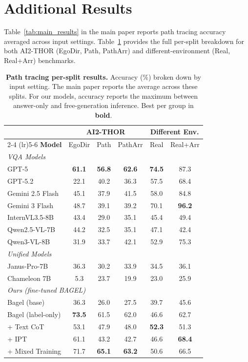 \documentclass{llmxive}
\begin{document}
\section{Additional Results}
\label{supp_additional_results}

Table~\ref{tab:main_results} in the main paper reports path tracing accuracy averaged across input settings.
Table~\ref{tab:pt_breakdown} provides the full per-split breakdown for both AI2-THOR (EgoDir, Path, PathArr) and different-environment (Real, Real+Arr) benchmarks.

\begin{table}[]
  \centering
  \small
  \begin{tabular}{l ccc cc}
    \toprule
    & \multicolumn{3}{c}{\textbf{AI2-THOR}} & \multicolumn{2}{c}{\textbf{Different Env.}} \\
    \cmidrule(lr){2-4} \cmidrule(lr){5-6}
    \textbf{Model}
      & EgoDir & Path & PathArr
      & Real & Real+Arr \\
    \midrule
    \multicolumn{6}{l}{\emph{VQA Models}} \\
    GPT-5            & \textbf{61.1} & \textbf{56.8} & \textbf{62.6} & \textbf{74.5} & 87.3 \\
    GPT-5.2          & 22.1 & 40.2 & 36.3 & 57.5 & 68.4 \\
    Gemini 2.5 Flash & 45.1 & 37.9 & 41.5 & 58.0 & 84.8 \\
    Gemini 3 Flash   & 48.7 & 39.1 & 39.2 & 70.1 & \textbf{96.2} \\
    InternVL3.5-8B   & 43.4 & 29.0 & 35.1 & 45.4 & 49.4 \\
    Qwen2.5-VL-7B   & 44.2 & 32.5 & 35.1 & 47.1 & 42.4 \\
    Qwen3-VL-8B     & 31.9 & 33.7 & 42.1 & 52.9 & 75.3 \\
    \midrule
    \multicolumn{6}{l}{\emph{Unified Models}} \\
    Janus-Pro-7B     & 36.3 & 30.2 & 33.9 & 34.5 & 36.1 \\
    Chameleon 7B     & 5.3 & 23.7 & 19.9 & 23.0 & 25.9 \\
    \midrule
    \multicolumn{6}{l}{\emph{Ours (fine-tuned BAGEL)}} \\
    Bagel (base)              & 36.3 & 26.0 & 27.5 & 39.7 & 45.6 \\
    Bagel (label-only)        & \textbf{73.5} & 61.5 & 62.0 & 46.6 & 62.7 \\
    + Text CoT                 & 53.1 & 47.9 & 48.0 & \textbf{52.3} & 51.3 \\
    + IPT                       & 61.1 & 43.2 & 42.7 & 46.6 & \textbf{68.4} \\
    + Mixed Training            & 71.7 & \textbf{65.1} & \textbf{63.2} & 50.6 & 66.5 \\
    \bottomrule
  \end{tabular}
  \label{tab:pt_breakdown}
\caption{\textbf{Path tracing per-split results.} Accuracy (\%) broken down by input setting. The main paper reports the average across these splits. For our models, accuracy reports the maximum between answer-only and free-generation inference. Best per group in \textbf{bold}.}
\end{table}
\end{document}
